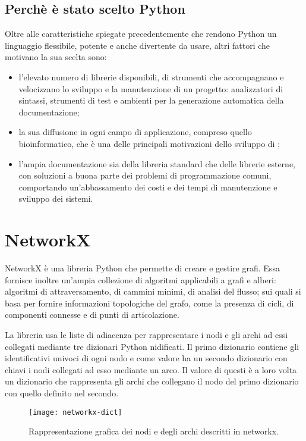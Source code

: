 \subsection{Perchè è stato scelto Python}
Oltre alle caratteristiche spiegate precedentemente che rendono Python
un linguaggio flessibile, potente e anche divertente da usare, altri fattori
che motivano la sua scelta sono:
\begin{itemize}
	\item l'elevato numero di librerie disponibili, di strumenti che accompagnano
		e velocizzano lo sviluppo e la manutenzione di un progetto:
		analizzatori di sintassi, strumenti di test e ambienti per la
		generazione automatica della documentazione;
	\item la sua diffusione in ogni campo di applicazione, compreso
		quello bioinformatico, che è una delle principali motivazioni dello sviluppo
		di \pygfa;
	\item l'ampia documentazione sia della libreria standard che delle librerie esterne,
		con soluzioni a buona parte dei problemi di programmazione comuni,
		comportando un'abbassamento dei costi e dei tempi di manutenzione e
		sviluppo dei sistemi.
\end{itemize}

\section{NetworkX}
NetworkX è una libreria Python che permette di creare e gestire grafi.
Essa fornisce inoltre un'ampia collezione di algoritmi applicabili a grafi e
alberi: algoritmi di attraversamento, di cammini minimi, di analisi del
flusso; sui quali si basa per fornire informazioni topologiche
del grafo, come la presenza di cicli, di componenti connesse e di
punti di articolazione.

La libreria usa le liste di adiacenza per rappresentare i nodi e gli archi ad essi
collegati mediante tre dizionari Python nidificati.
Il primo dizionario contiene gli identificativi univoci di ogni nodo e come valore
ha un secondo dizionario con chiavi i nodi collegati ad esso mediante un
arco. Il valore di questi è a loro volta un dizionario che rappresenta
gli archi che collegano il nodo del primo dizionario con quello definito nel secondo.

\begin{wrapfigure} {O} {0.35\textwidth}
	\begin{centering}	
		\texttt{[image: networkx-dict]}
		\caption[Rappresentazione nodi e archi networkx]{Rappresentazione grafica dei nodi e degli archi descritti in networkx.}
	\end{centering}
\end{wrapfigure}

